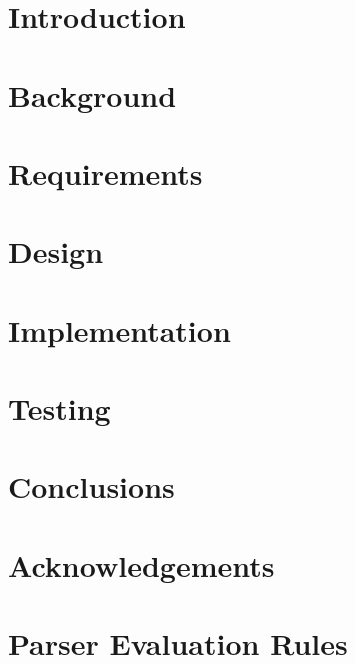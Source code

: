 \documentclass[12pt, twoside]{report}
\begin{document}
  

  \newpage
  \thispagestyle{empty}
  \mbox{}
  \newpage

  \setcounter{page}{1}
  

  \clearpage
    \printglossaries
  \clearpage

  \tableofcontents
  \clearpage

  \chapter{Introduction} \label{introduction}
    

  \chapter{Background} \label{background}
    

  \chapter{Requirements} \label{requirements}
    

  \chapter{Design} \label{design}
    

  \chapter{Implementation} \label{implementation}
    

  \chapter{Testing} \label{testing}
    

  \chapter{Conclusions} \label{conclusions}
    

  \chapter*{Acknowledgements} \label{acknowledgements}
    

  \appendix

  \chapter{Parser Evaluation Rules} \label{parser-lib}
    

  \clearpage
    
\end{document}
